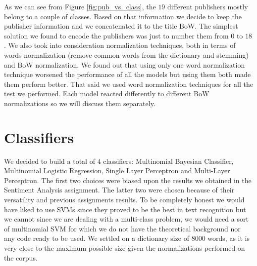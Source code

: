 \documentclass[10pt,a4paper]{report}
\begin{document}
As we can see from Figure \ref{fig:pub_vs_class}, the $19$ different publishers mostly belong to a couple of classes. Based on that information we decide to keep the publisher information and we concatenated it to the title BoW. The simplest solution we found to encode the publishers was just to number them from $0$ to $18$. We also took into consideration normalization techniques, both in terms of words normalization (remove common words from the dictionary and stemming) and BoW normalization. We found out that using only one word normalization technique worsened the performance of all the models but using them both made them perform better. That said we used word normalization techniques for all the test we performed. Each model reacted differently to different BoW normalizations so we will discuss them separately.  
\section{Classifiers}
We decided to build a total of $4$ classifiers: Multinomial Bayesian Classifier, Multinomial Logistic Regression, Single Layer Perceptron and Multi-Layer Perceptron. The first two choices were biased upon the results we obtained in the Sentiment Analysis assignment. The latter two were chosen because of their versatility and previous assignments results. To be completely honest we would have liked to use SVMs since they proved to be the best in text recognition but we cannot since we are dealing with a multi-class problem, we would need a sort of multinomial SVM for which we do not have the theoretical background nor any code ready to be used. We settled on a dictionary size of $8000$ words, as it is very close to the maximum possible size given the normalizations performed on the corpus.
\end{document}
